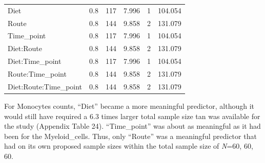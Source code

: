 \documentclass[
  12pt,
  letterpaper,
]{article}
\begin{document}
\begin{longtable}{l|rrrrr}
\midrule\addlinespace[2.5pt]
Diet & 0.8 & 117 & 7.996 & 1 & 104.054 \\ 
Route & 0.8 & 144 & 9.858 & 2 & 131.079 \\ 
Time\_point & 0.8 & 117 & 7.996 & 1 & 104.054 \\ 
Diet:Route & 0.8 & 144 & 9.858 & 2 & 131.079 \\ 
Diet:Time\_point & 0.8 & 117 & 7.996 & 1 & 104.054 \\ 
Route:Time\_point & 0.8 & 144 & 9.858 & 2 & 131.079 \\ 
Diet:Route:Time\_point & 0.8 & 144 & 9.858 & 2 & 131.079 \\ 
\bottomrule
\end{longtable}

For Monocytes counts, ``Diet'' became a more meaningful predictor, although it would still have required a 6.3 times larger total sample size tan was available for the study (Appendix Table 24). ``Time\_point'' was about as meaningful as it had been for the Myeloid\_cells. Thus, only ``Route'' was a meaningful predictor that had on its own proposed sample sizes within the total sample size of \emph{N}=60, 60, 60.
\end{document}
